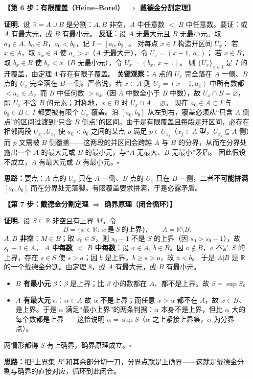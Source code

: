 \documentclass[11pt,a4paper,UTF8]{ctexart}
\newcommand{\R}{\mathbb R}
\newcommand{\st}[1]{\par\medskip\noindent\colorbox{blue!10}{\parbox{\dimexpr\linewidth-2\fboxsep}{\textbf{【#1】}}}\par\smallskip}
\newcommand{\pf}{\par\smallskip\noindent\textbf{证明.}\ }
\newcommand{\qed}{\hfill$\square$}
\newcommand{\idea}[1]{\par\smallskip\noindent\colorbox{yellow!20}{\parbox{\dimexpr\linewidth-2\fboxsep}{\textbf{思路：}#1}}\par\smallskip}
\begin{document}
\st{第 6 步：有限覆盖（Heine–Borel） $\Rightarrow$ 戴德金分割定理}
\pf 设 $\R=A\cup B$ 是分割：$A,B$ 非空，$A$ 中任意数 $<$ $B$ 中任意数。要证：或 $A$ 有最大元，或 $B$ 有最小元。
\textbf{反证}：设 $A$ 无最大元且 $B$ 无最小元。取 $a_0\in A,\ b_0\in B$，$a_0<b_0$，记 $I=[a_0,b_0]$。
对每点 $x\in I$ 构造开区间 $U_x$：
若 $x\in A$，取 $a_x\in A$ 使 $a_x>x$（$A$ 无最大元），令 $U_x=(x-1,\ a_x)$；
若 $x\in B$，取 $b_x\in B$ 使 $b_x<x$（$B$ 无最小元），令 $U_x=(b_x,\ x+1)$。
则 $\{U_x\}_{x\in I}$ 是 $I$ 的开覆盖，由定理 4 存在有限子覆盖。
\textbf{关键观察：}$A$ 点的 $U_x$ 完全落在 $A$ 一侧、$B$ 点的 $U_x$ 完全落在 $B$ 一侧。严格说，若 $x\in A$ 则 $U_x=(x-1,a_x)$ 中所有数都 $<a_x\in A$，而 $B$ 中任何数 $>a_x$（因 $A$ 中数全小于 $B$ 中数），故 $U_x\cap B=\varnothing$，即 $U_x$ 不含 $B$ 的元素；对称地，$x\in B$ 时 $U_x\cap A=\varnothing$。
现在 $a_0\in A\subset I$ 与 $b_0\in B\subset I$ 都要被有限个 $U_x$ 覆盖。沿 $[a_0,b_0]$ 从左到右，覆盖必须从“只含 $A$ 侧点”的区间过渡到“只含 $B$ 侧点”的区间。由于是有限覆盖且每段是开区间，必存在相邻两段 $U_{x_j},U_{x_k}$ 使 $a_0<b_0$ 之间的某点 $p$ 满足 $p\in U_{x_j}$（$x_j\in A$ 型，$U_{x_j}\subseteq A$ 侧）而 $p$ 又需被 $B$ 侧覆盖——这两段的并区间会跨越 $A$ 与 $B$ 的分界，从而在分界处露出一个 $A$ 的最大元或 $B$ 的最小元，与“$A$ 无最大、$B$ 无最小”矛盾。
因此假设不成立，$A$ 有最大元或 $B$ 有最小元。\qed
\idea{要点：$A$ 点的 $U_x$ 只在 $A$ 一侧、$B$ 点的 $U_x$ 只在 $B$ 一侧，二者\textbf{不可能拼满} $[a_0,b_0]$ 而在分界处无落脚。有限覆盖要求拼满，于是必露矛盾。}

\st{第 7 步：戴德金分割定理 $\Rightarrow$ 确界原理（闭合循环）}
\pf 设 $S\subseteq\R$ 非空且有上界 $M$。令
$$B=\{x\in\R:\ x\ \text{是}\ S\ \text{的上界}\},\qquad A=\R\setminus B.$$
\textbf{$A,B$ 非空}：$M\in B$；取 $s_0\in S$，则 $s_0-1$ 不是 $S$ 的上界（因 $s_0>s_0-1$），故 $s_0-1\in A$。
\textbf{$A$ 中每数 $<$ $B$ 中每数}：设 $a\in A,\ b\in B$。因 $a\notin B$，$a$ 不是 $S$ 的上界，存在 $s\in S$ 使 $s>a$；因 $b$ 是上界，$b\ge s>a$，故 $a<b$。
于是 $A|B$ 是 $\R$ 的一个戴德金分割。由定理 8，或 $A$ 有最大元，或 $B$ 有最小元。
\begin{itemize}[leftmargin=1.2em]
\item \textbf{$B$ 有最小元} $\beta$：$\beta$ 是上界；比 $\beta$ 小的数都在 $A$、都不是上界。故 $\beta=\sup S$。
\item \textbf{$A$ 有最大元} $\alpha$：$\alpha\in A$ 故 $\alpha$ 不是上界；而任意 $x>\alpha$ 都不在 $A$，故 $x\in B$、是上界。于是 $\alpha$ 满足“最小上界”的两条判据：$\alpha$ 本身不是上界，但比 $\alpha$ 大的每个数都是上界——这恰说明 $\alpha=\sup S$（$\alpha$ 之上紧接上界集，$\alpha$ 为分界点）。
\end{itemize}
两情形都得 $S$ 有上确界，确界原理成立。\qed
\idea{把“上界集 $B$”和其余部分切一刀，分界点就是上确界——这就是戴德金分割与确界的直接对应，循环到此闭合。}
\end{document}
